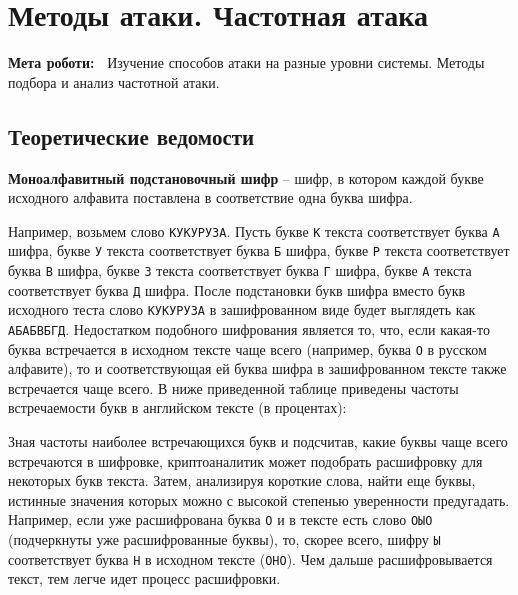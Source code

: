 \chapter{Методы атаки. Частотная атака} \label{chapt3}%
\textbf{Мета роботи:~}%
Изучение способов атаки на разные уровни системы. Методы подбора и анализ
частотной атаки.
\section{Теоретические ведомости} \label{sect2_a}
%
\textbf{Моноалфавитный подстановочный шифр} -- шифр, в котором каждой букве
исходного алфавита поставлена в соответствие одна буква шифра.


Например, возьмем слово \texttt{КУКУРУЗА}. Пусть букве \texttt{К} текста
соответствует буква \texttt{А} шифра, букве \texttt{У} текста соответствует
буква \texttt{Б} шифра, букве \texttt{Р} текста соответствует буква
\texttt{В} шифра, букве \texttt{З} текста соответствует буква \texttt{Г}
шифра, букве \texttt{А} текста соответствует буква \texttt{Д} шифра. После
подстановки букв шифра вместо букв исходного теста слово \texttt{КУКУРУЗА} в
зашифрованном виде будет выглядеть как \texttt{АБАБВБГД}. Недостатком
подобного шифрования является то, что, если какая-то буква встречается в
исходном тексте чаще всего (например, буква \texttt{О} в русском алфавите),
то и соответствующая ей буква шифра в зашифрованном тексте также встречается
чаще всего. В ниже приведенной таблице приведены частоты встречаемости букв в
английском тексте (в процентах):


Зная частоты наиболее встречающихся букв и подсчитав, какие буквы чаще всего
встречаются в шифровке, криптоаналитик может подобрать расшифровку для
некоторых букв текста. Затем, анализируя короткие слова, найти еще буквы,
истинные значения которых можно с высокой степенью уверенности предугадать.
Например, если уже расшифрована    буква    \texttt{О}    и    в    тексте
есть слово    \texttt{ОЫО}    (подчеркнуты  уже расшифрованные буквы), то,
скорее всего, шифру \texttt{Ы} соответствует буква \texttt{Н} в исходном
тексте (\texttt{ОНО}). Чем дальше расшифровывается текст, тем легче идет
процесс расшифровки.



